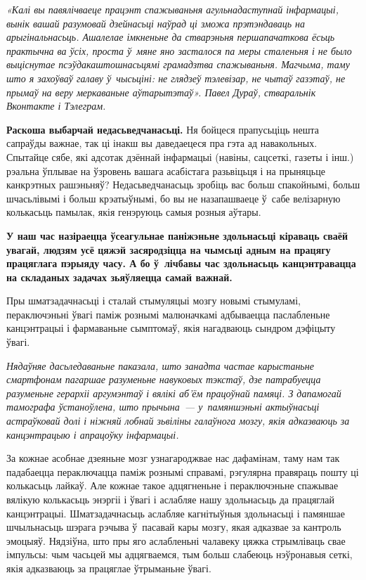 \emph{«Калі вы павялічваеце працэнт спажываньня агульнадаступнай інфармацыі, вынік вашай разумовай дзейнасьці наўрад ці зможа прэтэндаваць на арыгінальнасьць. Ашалелае імкненьне да стварэньня першапачаткова ёсьць практычна ва ўсіх, проста ў~мяне яно засталося па меры сталеньня і не было выціснутае псэўдакаштошнасьцямі грамадзтва спажываньня. Магчыма, таму што я захоўваў галаву ў~чысьціні: не глядзеў тэлевізар, не чытаў газэтаў, не прымаў на веру меркаваньне аўтарытэтаў». Павел Дураў, стваральнік Вконтакте і Тэлеграм.} 

\textbf{Раскоша выбарчай недасьведчанасьці.} Ня бойцеся прапусьціць нешта сапраўды важнае, так ці інакш вы даведаецеся пра гэта ад навакольных. Спытайце сябе, які адсотак дзённай інфармацыі (навіны, сацсеткі, газеты і інш.) рэальна ўплывае на ўзровень вашага асабістага разьвіцьця і на прыняцьце канкрэтных рашэньняў? Недасьведчанасьць зробіць вас больш спакойнымі, больш шчасьлівымі і больш крэатыўнымі, бо вы не назапашваеце ў~сабе велізарную колькасьць памылак, якія генэруюць самыя розныя аўтары.

\textbf{У наш час назіраецца ўсеагульнае паніжэньне здольнасьці кіраваць сваёй увагай, людзям усё цяжэй засяродзіцца на чымсьці адным на працягу працяглага пэрыяду часу. А бо ў~лічбавы час здольнасьць канцэнтравацца на складаных задачах зьяўляецца самай важнай.}

Пры шматзадачнасьці і сталай стымуляцыі мозгу новымі стымуламі, пераключэньні ўвагі паміж рознымі малюначкамі адбываецца паслабленьне канцэнтрацыі і фармаваньне сымптомаў, якія нагадваюць сындром дэфіцыту ўвагі.

\emph{Нядаўняе дасьледаваньне паказала, што занадта частае карыстаньне смартфонам пагаршае разуменьне навуковых тэкстаў, дзе патрабуецца разуменьне герархіі аргумэнтаў і вялікі аб'ём працоўнай памяці. З дапамогай тамографа ўстаноўлена, што прычына~--- у~памяншэньні актыўнасьці астраўковай долі і ніжняй лобнай зьвіліны галаўнога мозгу, якія адказваюць за канцэнтрацыю і апрацоўку інфармацыі.}

За кожнае асобнае дзеяньне мозг узнагароджвае нас дафамінам, таму нам так падабаецца пераключацца паміж рознымі справамі, рэгулярна правяраць пошту ці колькасьць лайкаў. Але кожнае такое адцягненьне і пераключэньне спажывае вялікую колькасьць энэргіі і ўвагі і аслабляе нашу здольнасьць да працяглай канцэнтрацыі. Шматзадачнасьць аслабляе кагнітыўныя здольнасьці і памяншае шчыльнасьць шэрага рэчыва ў~пасавай кары мозгу, якая адказвае за кантроль эмоцыяў. Нядзіўна, што пры яго аслабленьні чалавеку цяжка стрымліваць свае імпульсы: чым часьцей мы адцягваемся, тым больш слабеюць нэўронавыя сеткі, якія адказваюць за працяглае ўтрыманьне ўвагі.

